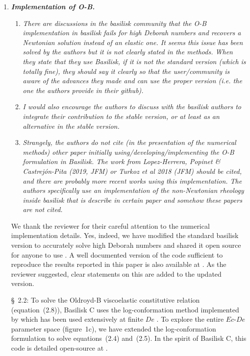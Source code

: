 \documentclass[]{article}
\newcommand{\oo}{\color{magenta} \normalfont}
\newcommand{\bb}{\color{black} \normalfont}
\begin{document}
\begin{enumerate}
     \item  \textbf{\textit{Implementation of O-B.}}
      \begin{enumerate}
          \item \textit{There are discussions in the basilisk community that the O-B implementation in basilisk fails for high Deborah numbers and recovers a Newtonian solution instead of an elastic one. It seems this issue has been solved by the authors but it is not clearly stated in the methods. When they state that they use Basilisk, if it is not the standard version (which is totally fine), they should say it clearly so that the user/community is aware of the advances they made and can use the proper version (i.e. the one the authors provide in their github).}

          \item \textit{I would also encourage the authors to discuss with the basilisk authors to integrate their contribution to the stable version, or at least as an alternative in the stable version.}

          \item \textit{Strangely, the authors do not cite (in the presentation of the numerical methods) other paper initially using/developing/implementing the O-B formulation in Basilisk. The work from Lopez-Herrera, Popinet \& Castrejón-Pita (2019, JFM) or Turkoz et al 2018 (JFM) should be cited, and there are probably more recent works using this implementation. The authors specifically use an implementation of the non-Newtonian rheology inside basilisk that is describe in certain paper and somehow these papers are not cited.}
      \end{enumerate}

      We thank the reviewer for their careful attention to the numerical implementation details.
      Yes, indeed, we have modified the standard basilisk version to accurately solve high Deborah numbers and shared it open source for anyone to use \citep{vatsalElastoFlow2024}. A well documented version of the code sufficient to reproduce the results reported in this paper is also available at \citet{Sanjay2024code}.
      As the reviewer suggested, clear statements on this are added to the updated version.

      \S~2.2: \oo
      To solve the Oldroyd-B viscoelastic constitutive relation (equation~(2.8)), Basilisk C uses the log-conformation method \citep{fattal2004constitutive} implemented by \citet{lopez2019adaptive} which has been used extensively at finite $De$ \citep{turkoz2018axisymmetric, turkoz2021simulation}. To explore the entire $Ec$-$De$ parameter space  (figure~1c), we have extended the log-conformation formulation to solve equations~(2.4) and~(2.5). In the spirit of Basilisk C, this code is detailed open-source at \citet{vatsalElastoFlow2024}.\bb\,


\end{enumerate}
\end{document}
